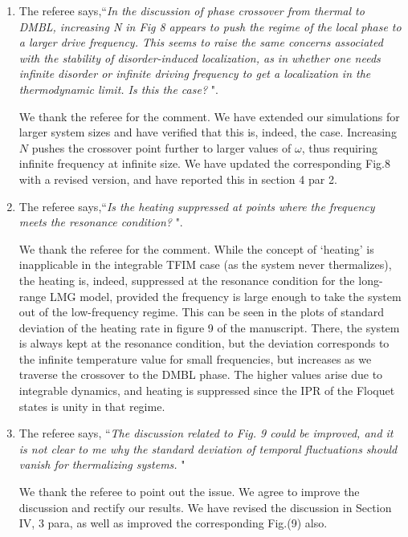 \documentclass[aps,prb,reprint,showpacs,floatfix,superscriptaddress, onecolumn, nofootinbib, 9pt]{revtex4-2}
\newcommand{\response}[1]{{\color{blue}#1}} %
\begin{document}
\begin{enumerate}
		\item The referee says,``\textit{In the discussion of phase crossover from thermal to DMBL, increasing N in Fig 8 appears to push the regime of the local phase to a larger drive frequency. This seems to raise the same concerns associated with the stability of disorder-induced localization, as in whether one needs infinite disorder or infinite driving frequency to
			get a localization in the thermodynamic limit. Is this the case? }".
		
		\response{    	
			We thank the referee for the comment. We have extended our simulations for larger system sizes and have verified that this is, indeed, the case. Increasing $N$ pushes the crossover point further to larger values of $\omega$, thus requiring infinite frequency at infinite size. We have updated the corresponding Fig.8 with a revised version, and have reported this in section 4 par 2.
		}
		\item The referee says,``\textit{Is the heating suppressed at points where the frequency meets the resonance condition? }".
		
		\response{
		We thank the referee for the comment. While the concept of `heating' is inapplicable in the integrable TFIM case (as the system never thermalizes), the heating is, indeed, suppressed at the resonance condition for the long-range LMG model, provided the frequency is large enough to take the system out of the low-frequency regime. This can be seen in the plots of standard deviation of the heating rate in figure 9 of the manuscript. There, the system is always kept at the resonance condition, but the deviation corresponds to the infinite temperature value for small frequencies, but increases as we traverse the crossover to the DMBL phase. The higher values arise due to integrable dynamics, and heating is suppressed since the IPR of the Floquet states is unity in that regime.}
		
		\item The referee says, ``\textit{The discussion related to Fig. 9 could be improved, and it is not clear to me why the standard deviation of temporal fluctuations should vanish for thermalizing systems. }"\\
		
		\response{ We thank the referee to point out the issue. We agree to improve the discussion and rectify our results. We have revised the discussion in Section IV, 3 para, as well as improved the corresponding Fig.(9) also.
			
}
\end{enumerate}
\end{document}
